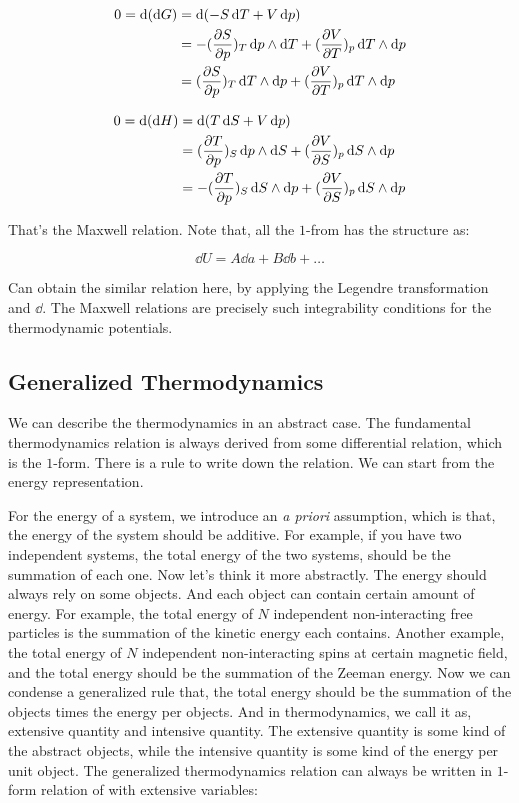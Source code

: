\documentclass[../main.tex]{subfiles}
\begin{document}
\begin{align}
    0 = \dd{(\dd{G})} &= \dd{(-S\dd{T} +V\dd{p})}\nonumber\\
    &= -(\pdv{S}{p})_T\dd{p}\wedge\dd{T} + (\pdv{V}{T})_p\dd{T}\wedge\dd{p}\nonumber\\
    &= (\pdv{S}{p})_T\dd{T}\wedge\dd{p} + (\pdv{V}{T})_p\dd{T}\wedge\dd{p}
\end{align}

\begin{align}
    0 = \dd{(\dd{H})} &= \dd{(T\dd{S} + V\dd{p})}\nonumber\\
    &= (\pdv{T}{p})_S\dd{p}\wedge\dd{S} + (\pdv{V}{S})_p\dd{S}\wedge\dd{p}\nonumber\\
    &= -(\pdv{T}{p})_S\dd{S}\wedge\dd{p} + (\pdv{V}{S})_p\dd{S}\wedge\dd{p}
\end{align}

That's the Maxwell relation. Note that, all the $1$-from has the structure as:

\begin{equation}
    \dd{U} = A\dd{a} + B\dd{b} + \dots
\end{equation}

Can obtain the similar relation here, by applying the Legendre transformation and $\dd$. The Maxwell relations are precisely such integrability conditions for the thermodynamic potentials.

\subsection{Generalized Thermodynamics}

We can describe the thermodynamics in an abstract case. The fundamental thermodynamics relation is always derived from some differential relation, which is the $1$-form. There is a rule to write down the relation. We can start from the energy representation.

For the energy of a system, we introduce an \emph{a priori} assumption, which is that, the energy of the system should be additive. For example, if you have two independent systems, the total energy of the two systems, should be the summation of each one. Now let's think it more abstractly. The energy should always rely on some objects. And each object can contain certain amount of energy. For example, the total energy of $N$ independent non-interacting free particles is the summation of the kinetic energy each contains. Another example, the total energy of $N$ independent non-interacting spins at certain magnetic field, and the total energy should be the summation of the Zeeman energy. Now we can condense a generalized rule that, the total energy should be the summation of the objects times the energy per objects. And in thermodynamics, we call it as, extensive quantity and intensive quantity. The extensive quantity is some kind of the abstract objects, while the intensive quantity is some kind of the energy per unit object. The generalized thermodynamics relation can always be written in $1$-form relation of with extensive variables:
\end{document}
